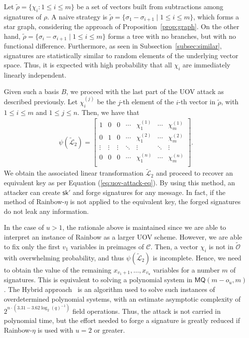\documentclass[english]{ufsc-thesis-rn46-2019/ufsc-thesis-rn46-2019}
\theoremstyle{definition}
\begin{document}
Let $\widetilde{\rho} = \{ \chi_{i} : 1 \leq i \leq m \}$ be a set of vectors
built from subtractions among signatures of $\rho$. A naive strategy is
$\widetilde{\rho} = \{ \sigma_{1} - \sigma_{i + 1} \mid 1 \leq i \leq m \}$,
which forms a star graph, considering the approach of
Proposition~\ref{prop:graph}. On the other hand,
$\widetilde{\rho} = \{ \sigma_{i} - \sigma_{i + 1} \mid 1 \leq i \leq m \}$
forms a tree with no branches, but with no functional difference. Furthermore,
as seen in Subsection~\ref{subsec:similar}, signatures are statistically
similar to random elements of the underlying vector space. Thus, it is expected
with high probability that all $\chi_{i}$ are immediately linearly independent.

Given such a basis $B$, we proceed with the last part of the UOV attack as
described previously. Let $\chi_{i}^{(j)}$ be the $j$-th element of the $i$-th
vector in $\widetilde{\rho}$, with $1 \leq i \leq m$ and $1 \leq j \leq n$.
Then, we have that
\begin{align}
  \psi(\widetilde{\mathcal{L}}_{2}) = \begin{bmatrix}
    1 & 0 & 0 & \cdots & \chi_{1}^{(1)} & \cdots & \chi_{m}^{(1)} \\
    0 & 1 & 0 & \cdots & \chi_{1}^{(2)} & \cdots & \chi_{m}^{(2)} \\
    \vdots & \vdots & \vdots & \ddots & \vdots & \ddots & \vdots  \\
    0 & 0 & 0 & \cdots & \chi_{1}^{(n)} & \cdots & \chi_{m}^{(n)} \\
  \end{bmatrix}.
\end{align}
We obtain the associated linear transformation $\widetilde{\mathcal{L}}_{2}$
and proceed to recover an equivalent key as per Equation
(\ref{eq:uov-attack-eq}). By using this method, an attacker can create
$\mathsf{sk'}$ and forge signatures for any message. In fact, if the method of
Rainbow-$\eta$ is not applied to the equivalent key, the forged signatures do
not leak any information.

In the case of $u > 1$, the rationale above is maintained since we are able to
interpret an instance of Rainbow as a larger UOV scheme. However, we are able
to fix only the first $v_{1}$ variables in preimages of $\mathcal{C}$. Then,
a vector $\chi_{i}$ is not in $\widetilde{\mathcal{O}}$ with overwhelming
probability, and thus $\psi(\widetilde{\mathcal{L}}_{2})$ is incomplete. Hence,
we need to obtain the value of the remaining $x_{v_{1} + 1}, \dots, x_{v_{u}}$
variables for a number $m$ of signatures. This is equivalent to solving
a polynomial system in $\textsf{MQ}(m - o_{u}, m)$. The Hybrid
approach~\cite{Bettale:201207} is an algorithm used to solve such instances of
overdetermined polynomial systems, with an estimate asymptotic complexity of
$2^{n \cdot (3.31 - 3.62 \log_{2} {(q)}^{-1})}$ field operations. Thus, the
attack is not carried in polynomial time, but the effort needed to forge
a signature is greatly reduced if Rainbow-$\eta$ is used with $u = 2$ or
greater.
\end{document}
